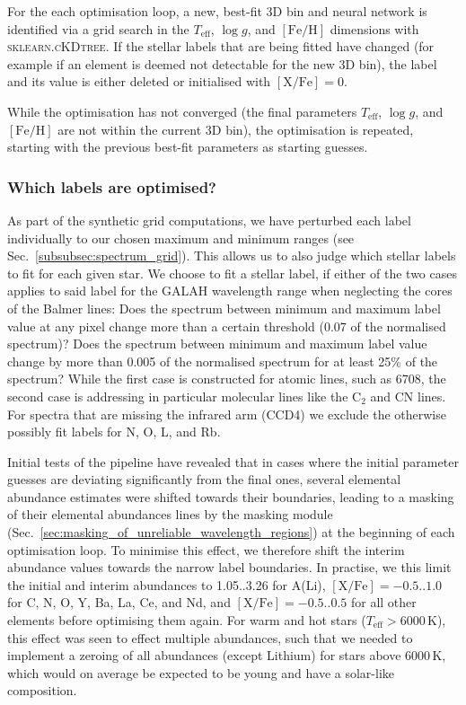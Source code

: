 \documentclass[
  journal=pasa,
  manuscript=research-paper, %
  year=2023,
  volume=37
]{cup-journal}
\newcommand\ion[2]{\text{#1\,\textsc{\lowercase{#2}}}}	%
\newcommand{\Teff}{$T_\mathrm{eff}$\xspace}
\newcommand{\logg}{$\log g$\xspace}
\newcommand{\feh}{$\mathrm{[Fe/H]}$\xspace}
\newcommand{\TLF}{\Teff, \logg, and \feh}
\newcommand{\K}{\,\mathrm{K}}	%
\begin{document}
For the each optimisation loop, a new, best-fit 3D bin and neural network is identified via a grid search in the \TLF dimensions with \textsc{sklearn.cKDtree}. If the stellar labels that are being fitted have changed (for example if an element is deemed not detectable for the new 3D bin), the label and its value is either deleted or initialised with $\mathrm{[X/Fe]} = 0$.

While the optimisation has not converged (the final parameters \TLF are not within the current 3D bin), the optimisation is repeated, starting with the previous best-fit parameters as starting guesses.

\subsubsection{Which labels are optimised?} \label{sec:which_labels_are_optimised}


As part of the synthetic grid computations, we have perturbed each label individually to our chosen maximum and minimum ranges (see Sec.~\ref{subsubsec:spectrum_grid}). This allows us to also judge which stellar labels to fit for each given star. We choose to fit a stellar label, if either of the two cases applies to said label for the GALAH wavelength range when neglecting the cores of the Balmer lines: Does the spectrum between minimum and maximum label value at any pixel change more than a certain threshold (0.07 of the normalised spectrum)? Does the spectrum between minimum and maximum label value change by more than 0.005 of the normalised spectrum for at least 25\% of the spectrum? While the first case is constructed for atomic lines, such as \ion{Li}{i} 6708, the second case is addressing in particular molecular lines like the $\mathrm{C_2}$ and $\mathrm{CN}$ lines. For spectra that are missing the infrared arm (CCD4) we exclude the otherwise possibly fit labels for N, O, L, and Rb.

Initial tests of the pipeline have revealed that in cases where the initial parameter guesses are deviating significantly from the final ones, several elemental abundance estimates were shifted towards their boundaries, leading to a masking of their elemental abundances lines by the masking module (Sec.~\ref{sec:masking_of_unreliable_wavelength_regions}) at the beginning of each optimisation loop. To minimise this effect, we therefore shift the interim abundance values towards the narrow label boundaries. In practise, we this limit the initial and interim abundances to 1.05..3.26 for A(Li), $\mathrm{[X/Fe]} = -0.5..1.0$ for C, N, O, Y, Ba, La, Ce, and Nd, and $\mathrm{[X/Fe]} = -0.5..0.5$ for all other elements before optimising them again. For warm and hot stars ($T_\text{eff} > 6000\K$), this effect was seen to effect multiple abundances, such that we needed to implement a zeroing of all abundances (except Lithium) for stars above $6000\K$, which would on average be expected to be young and have a solar-like composition.
\end{document}
